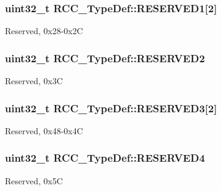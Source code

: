 \subsubsection[{\texorpdfstring{R\+E\+S\+E\+R\+V\+E\+D1}{RESERVED1}}]{\setlength{\rightskip}{0pt plus 5cm}uint32\+\_\+t R\+C\+C\+\_\+\+Type\+Def\+::\+R\+E\+S\+E\+R\+V\+E\+D1\mbox{[}2\mbox{]}}\hypertarget{struct_r_c_c___type_def_a291f9ae23a96c1bfbab257aad87597a5}{}\label{struct_r_c_c___type_def_a291f9ae23a96c1bfbab257aad87597a5}
Reserved, 0x28-\/0x2C 
\subsubsection[{\texorpdfstring{R\+E\+S\+E\+R\+V\+E\+D2}{RESERVED2}}]{\setlength{\rightskip}{0pt plus 5cm}uint32\+\_\+t R\+C\+C\+\_\+\+Type\+Def\+::\+R\+E\+S\+E\+R\+V\+E\+D2}\hypertarget{struct_r_c_c___type_def_a94cb7e7b923ebacab99c967d0f808235}{}\label{struct_r_c_c___type_def_a94cb7e7b923ebacab99c967d0f808235}
Reserved, 0x3C 
\subsubsection[{\texorpdfstring{R\+E\+S\+E\+R\+V\+E\+D3}{RESERVED3}}]{\setlength{\rightskip}{0pt plus 5cm}uint32\+\_\+t R\+C\+C\+\_\+\+Type\+Def\+::\+R\+E\+S\+E\+R\+V\+E\+D3\mbox{[}2\mbox{]}}\hypertarget{struct_r_c_c___type_def_a74071ea325d6bc064817ed0a7a4d7def}{}\label{struct_r_c_c___type_def_a74071ea325d6bc064817ed0a7a4d7def}
Reserved, 0x48-\/0x4C 
\subsubsection[{\texorpdfstring{R\+E\+S\+E\+R\+V\+E\+D4}{RESERVED4}}]{\setlength{\rightskip}{0pt plus 5cm}uint32\+\_\+t R\+C\+C\+\_\+\+Type\+Def\+::\+R\+E\+S\+E\+R\+V\+E\+D4}\hypertarget{struct_r_c_c___type_def_a0f009e4bd1777ac1b86ca27e23361a0e}{}\label{struct_r_c_c___type_def_a0f009e4bd1777ac1b86ca27e23361a0e}
Reserved, 0x5C 
